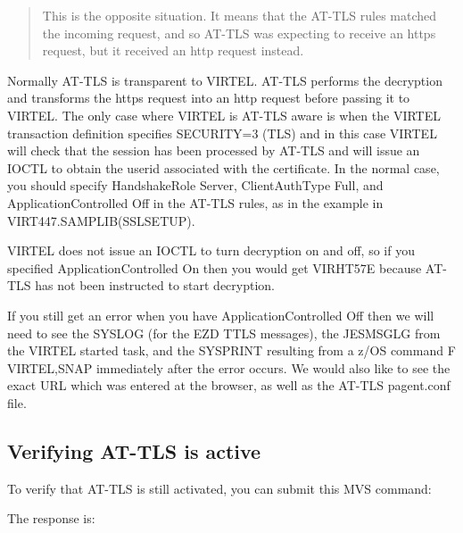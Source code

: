 \documentclass[letterpaper,10pt,english]{sphinxmanual}
\begin{document}
\begin{quote}

This is the opposite situation. It means that the AT-TLS rules matched the incoming request, and so AT-TLS was expecting to receive an https request, but it received an http request instead.
\end{quote}

Normally AT-TLS is transparent to VIRTEL. AT-TLS performs the decryption and transforms the https request into an http request before passing it to VIRTEL. The only case where VIRTEL is AT-TLS aware is when the VIRTEL transaction definition specifies SECURITY=3 (TLS) and in this case VIRTEL will check that the session has been processed by AT-TLS and will issue an IOCTL to obtain the userid associated with the certificate. In the normal case, you should specify HandshakeRole Server, ClientAuthType Full, and ApplicationControlled Off in the AT-TLS rules, as in the example in VIRT447.SAMPLIB(SSLSETUP).

VIRTEL does not issue an IOCTL to turn decryption on and off, so if you specified ApplicationControlled On then you would get VIRHT57E because AT-TLS has not been instructed to start decryption.

If you still get an error when you have ApplicationControlled Off then we will need to see the SYSLOG (for the EZD TTLS messages), the JESMSGLG from the VIRTEL started task, and the SYSPRINT resulting from a z/OS command F VIRTEL,SNAP immediately after the error occurs. We would also like to see the exact URL which was entered at the browser, as well as the AT-TLS pagent.conf file.


\subsection{Verifying AT-TLS is active}
\label{\detokenize{connectivity_guide:verifying-at-tls-is-active}}
To verify that AT-TLS is still activated, you can submit this MVS command:

\begin{sphinxVerbatim}[commandchars=\\\{\}]
 
\end{sphinxVerbatim}

The response is:

\begin{sphinxVerbatim}[commandchars=\\\{\}]
                     
\end{sphinxVerbatim}
\end{document}
